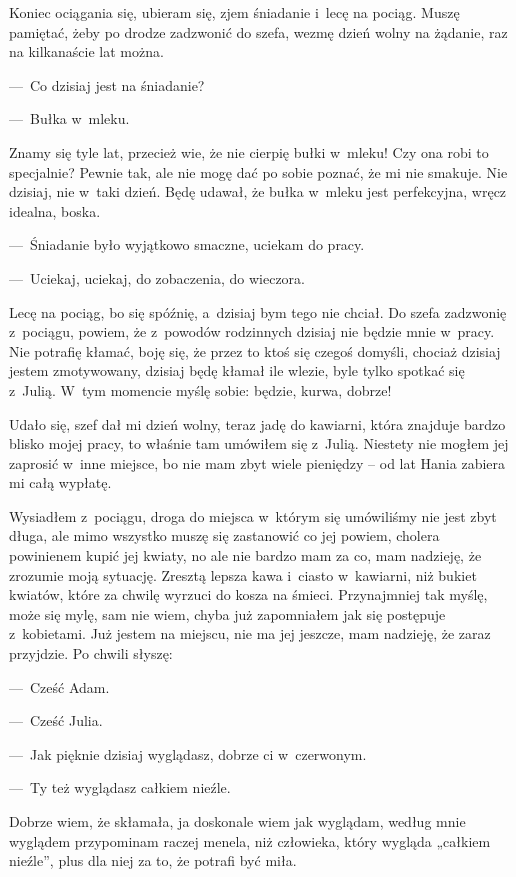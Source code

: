 Koniec ociągania się, ubieram się, zjem śniadanie i~lecę na pociąg. Muszę pamiętać, żeby po drodze zadzwonić do 
szefa, wezmę dzień wolny na żądanie, raz na kilkanaście lat można.

---~Co dzisiaj jest na śniadanie?

---~Bułka w~mleku.

Znamy się tyle lat, przecież wie, że nie cierpię bułki w~mleku! Czy ona robi to specjalnie? Pewnie tak, ale nie mogę 
dać po sobie poznać, że mi nie smakuje. Nie dzisiaj, nie w~taki dzień. Będę udawał, że bułka w~mleku jest 
perfekcyjna, wręcz idealna, boska.

---~Śniadanie było wyjątkowo smaczne, uciekam do pracy.

---~Uciekaj, uciekaj, do zobaczenia, do wieczora.

Lecę na pociąg, bo się spóźnię, a~dzisiaj bym tego nie chciał. Do szefa zadzwonię z~pociągu, powiem, że z~powodów 
rodzinnych dzisiaj nie będzie mnie w~pracy. Nie potrafię kłamać, boję się, że przez to ktoś się czegoś domyśli, 
chociaż dzisiaj jestem zmotywowany, dzisiaj będę kłamał ile wlezie, byle tylko spotkać się z~Julią. W~tym momencie 
myślę sobie: będzie, kurwa, dobrze!

Udało się, szef dał mi dzień wolny, teraz jadę do kawiarni, która znajduje bardzo blisko mojej pracy, to właśnie tam 
umówiłem się z~Julią. Niestety nie mogłem jej zaprosić w~inne miejsce, bo nie mam zbyt wiele pieniędzy -- od lat 
Hania zabiera mi całą wypłatę.

Wysiadłem z~pociągu, droga do miejsca w~którym się umówiliśmy nie jest zbyt długa, ale mimo wszystko muszę się 
zastanowić co jej powiem, cholera powinienem kupić jej kwiaty, no ale nie bardzo mam za co, mam nadzieję, że zrozumie 
moją sytuację. Zresztą lepsza kawa i~ciasto w~kawiarni, niż bukiet kwiatów, które za chwilę wyrzuci do kosza na 
śmieci. Przynajmniej tak myślę, może się mylę, sam nie wiem, chyba już zapomniałem jak się postępuje z~kobietami. Już 
jestem na miejscu, nie ma jej jeszcze, mam nadzieję, że zaraz przyjdzie. Po chwili słyszę:

---~Cześć Adam.

---~Cześć Julia.

---~Jak pięknie dzisiaj wyglądasz, dobrze ci w~czerwonym.

---~Ty też wyglądasz całkiem nieźle.

Dobrze wiem, że skłamała, ja doskonale wiem jak wyglądam, według mnie wyglądem przypominam raczej menela, niż 
człowieka, który wygląda „całkiem nieźle”, plus dla niej za to, że potrafi być miła.

